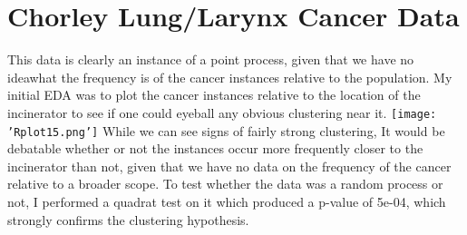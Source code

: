 \documentclass[12pt]{article}
\begin{document}
\section*{Chorley Lung/Larynx Cancer Data}
This data is clearly an instance of a point process, given that we have no ideawhat the frequency is of the cancer instances relative to the population. My initial EDA was to plot the cancer instances relative to the location of the incinerator to see if one could eyeball any obvious clustering near it.
\newline
\texttt{[image: 'Rplot15.png']}
\newline
While we can see signs of fairly strong clustering, It would be debatable whether or not the instances occur more frequently closer to the incinerator than not, given that we have no data on the frequency of the cancer relative to a broader scope. To test whether the data was a random process or not, I performed a quadrat test on it which produced a p-value of 5e-04, which strongly confirms the clustering hypothesis. 
\end{document}

